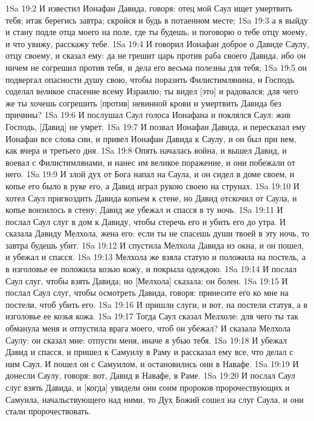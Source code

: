 1Sa 19:2  И известил Ионафан Давида, говоря: отец мой Саул ищет умертвить тебя; итак берегись завтра; скройся и будь в потаенном месте;
1Sa 19:3  а я выйду и стану подле отца моего на поле, где ты будешь, и поговорю о тебе отцу моему, и что увижу, расскажу тебе.
1Sa 19:4  И говорил Ионафан доброе о Давиде Саулу, отцу своему, и сказал ему: да не грешит царь против раба своего Давида, ибо он ничем не согрешил против тебя, и дела его весьма полезны для тебя;
1Sa 19:5  он подвергал опасности душу свою, чтобы поразить Филистимлянина, и Господь соделал великое спасение всему Израилю; ты видел [это] и радовался; для чего же ты хочешь согрешить [против] невинной крови и умертвить Давида без причины?
1Sa 19:6  И послушал Саул голоса Ионафана и поклялся Саул: жив Господь, [Давид] не умрет.
1Sa 19:7  И позвал Ионафан Давида, и пересказал ему Ионафан все слова сии, и привел Ионафан Давида к Саулу, и он был при нем, как вчера и третьего дня.
1Sa 19:8  Опять началась война, и вышел Давид, и воевал с Филистимлянами, и нанес им великое поражение, и они побежали от него.
1Sa 19:9  И злой дух от Бога напал на Саула, и он сидел в доме своем, и копье его было в руке его, а Давид играл рукою своею на струнах.
1Sa 19:10  И хотел Саул пригвоздить Давида копьем к стене, но Давид отскочил от Саула, и копье вонзилось в стену; Давид же убежал и спасся в ту ночь.
1Sa 19:11  И послал Саул слуг в дом к Давиду, чтобы стеречь его и убить его до утра. И сказала Давиду Мелхола, жена его: если ты не спасешь души твоей в эту ночь, то завтра будешь убит.
1Sa 19:12  И спустила Мелхола Давида из окна, и он пошел, и убежал и спасся.
1Sa 19:13  Мелхола же взяла статую и положила на постель, а в изголовье ее положила козью кожу, и покрыла одеждою.
1Sa 19:14  И послал Саул слуг, чтобы взять Давида; но [Мелхола] сказала: он болен.
1Sa 19:15  И послал Саул слуг, чтобы осмотреть Давида, говоря: принесите его ко мне на постели, чтоб убить его.
1Sa 19:16  И пришли слуги, и вот, на постели статуя, а в изголовье ее козья кожа.
1Sa 19:17  Тогда Саул сказал Мелхоле: для чего ты так обманула меня и отпустила врага моего, чтоб он убежал? И сказала Мелхола Саулу: он сказал мне: отпусти меня, иначе я убью тебя.
1Sa 19:18  И убежал Давид и спасся, и пришел к Самуилу в Раму и рассказал ему все, что делал с ним Саул. И пошел он с Самуилом, и остановились они в Навафе.
1Sa 19:19  И донесли Саулу, говоря: вот, Давид в Навафе, в Раме.
1Sa 19:20  И послал Саул слуг взять Давида, и [когда] увидели они сонм пророков пророчествующих и Самуила, начальствующего над ними, то Дух Божий сошел на слуг Саула, и они стали пророчествовать.
